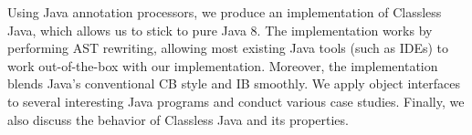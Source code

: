 
%
%
%
%








Using Java annotation processors, we produce an implementation of
Classless Java, which allows us to stick to pure Java 8.
The implementation works
by performing AST rewriting, allowing most existing Java tools (such as
IDEs) to work out-of-the-box with our implementation. Moreover, the
implementation blends Java's conventional CB style and IB smoothly.
We apply object interfaces to several interesting
Java programs and conduct various case studies. Finally, we also
discuss the behavior of Classless Java and
its properties.

